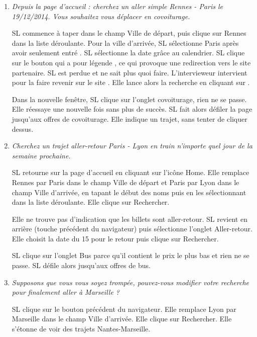 \begin{enumerate}
\item \textit{Depuis la page d'accueil : cherchez un aller simple Rennes - Paris le 19/12/2014. Vous souhaitez vous d\'{e}placer en covoiturage.}

SL commence \`{a} taper  dans le champ \og{}Ville de d\'{e}part\fg{}, puis clique sur Rennes dans la liste d\'{e}roulante. Pour la ville d'arriv\'{e}e, SL s\'{e}lectionne Paris apr\`{e}s avoir seulement entr\'{e} .
SL s\'{e}lectionne la date gr\^{a}ce au calendrier.
SL clique sur le bouton qui a pour l\'{e}gende , ce qui provoque une redirection vers le site partenaire. SL est perdue et ne sait plus quoi faire. L'intervieweur intervient pour la faire revenir sur le site \kel.
Elle lance alors la recherche en cliquant sur .

Dans la nouvelle fen\^{e}tre, SL clique sur l'onglet covoiturage, rien ne se passe. Elle r\'{e}essaye une nouvelle fois sans plus de succ\`{e}s. SL fait alors d\'{e}filer la page jusqu'aux offres de covoiturage. Elle indique un trajet, sans tenter de cliquer dessus.



\item \textit{Cherchez un trajet aller-retour Paris - Lyon en train n'importe quel jour de la semaine prochaine.}

SL retourne sur la page d'accueil en cliquant sur l'ic\^{o}ne \og{}Home\fg{}. 
Elle remplace Rennes par Paris dans le champ \og{}Ville de d\'{e}part\fg{} et Paris par Lyon dans le champ \og{}Ville d'arriv\'{e}e\fg{}, en tapant le d\'{e}but des noms puis en les s\'{e}lectionnant dans la liste d\'{e}roulante. 
Elle clique sur \og{}Rechercher\fg{}.

Elle ne trouve pas d'indication que les billets sont aller-retour. SL revient en arri\`{e}re (touche \og{}pr\'{e}c\'{e}dent\fg{} du navigateur) puis s\'{e}lectionne l'onglet \og{}Aller-retour\fg{}. Elle choisit la date du 15 pour le retour puis clique sur \og{}Rechercher\fg{}.

SL clique sur l'onglet \og{}Bus\fg{} parce qu'il contient le prix le plus bas et rien ne se passe. SL d\'{e}file alors jusqu'aux offres de bus.


\item \textit{Supposons que vous vous soyez tromp\'{e}e, pouvez-vous modifier votre recherche pour finalement aller \`{a} Marseille ?}

SL clique sur le bouton pr\'{e}c\'{e}dent du navigateur. 
Elle remplace Lyon par Marseille dans le champ \og{}Ville d'arriv\'{e}e\fg{}. 
Elle clique sur \og{}Rechercher\fg{}.
Elle s'\'{e}tonne de voir des trajets Nantes-Marseille.



\end{enumerate}
